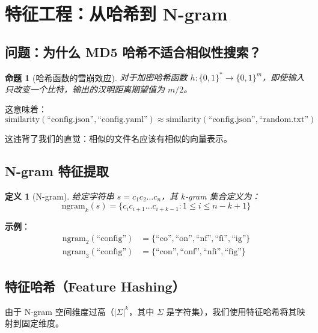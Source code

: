 \documentclass[12pt,a4paper]{article}
\newtheorem{proposition}[theorem]{命题}
\newtheorem{definition}{定义}[section]
\begin{document}
\section{特征工程：从哈希到 N-gram}

\subsection{问题：为什么 MD5 哈希不适合相似性搜索？}

\begin{proposition}[哈希函数的雪崩效应]
对于加密哈希函数 $h: \{0,1\}^* \rightarrow \{0,1\}^m$，即使输入只改变一个比特，输出的汉明距离期望值为 $m/2$。
\end{proposition}

这意味着：
\begin{equation}
\text{similarity}(\text{``config.json''}, \text{``config.yaml''}) \approx \text{similarity}(\text{``config.json''}, \text{``random.txt''})
\end{equation}

这违背了我们的直觉：相似的文件名应该有相似的向量表示。

\subsection{N-gram 特征提取}

\begin{definition}[N-gram]
给定字符串 $s = c_1c_2\ldots c_n$，其 $k$-gram 集合定义为：
\begin{equation}
\text{ngram}_k(s) = \{c_ic_{i+1}\ldots c_{i+k-1} : 1 \leq i \leq n-k+1\}
\end{equation}
\end{definition}

\textbf{示例}：
\begin{align*}
\text{ngram}_2(\text{``config''}) &= \{\text{``co''}, \text{``on''}, \text{``nf''}, \text{``fi''}, \text{``ig''}\} \\
\text{ngram}_3(\text{``config''}) &= \{\text{``con''}, \text{``onf''}, \text{``nfi''}, \text{``fig''}\}
\end{align*}

\subsection{特征哈希（Feature Hashing）}

由于 N-gram 空间维度过高（$|\Sigma|^k$，其中 $\Sigma$ 是字符集），我们使用特征哈希将其映射到固定维度。
\end{document}
